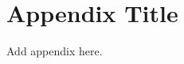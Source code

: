 \chapter{Appendix Title}
\label{AppendixB}
\ifpdf
    \graphicspath{{8_backmatter/figures/PNG/}{8_backmatter/figures/PDF/}{8_backmatter/figures/}}
\else
    \graphicspath{{8_backmatter/figures/EPS/}{8_backmatter/figures/}}
\fi

Add appendix here.


